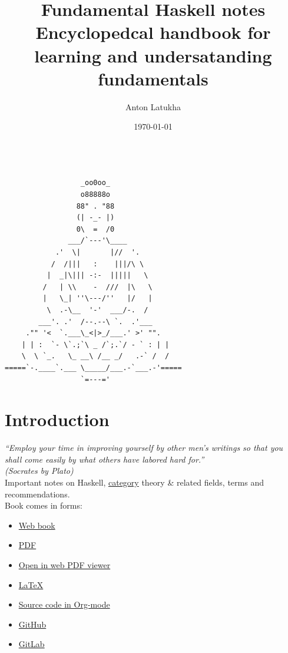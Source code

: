 \documentclass[a4paper,14pt,oneside]{book}
\author{Anton Latukha}
\date{\today}
\title{Fundamental Haskell notes\\\medskip
\large Encyclopedcal handbook for learning and undersatanding fundamentals}
\begin{document}
\maketitle
\setcounter{tocdepth}{10}
\tableofcontents

\begin{verbatim}

                  _oo0oo_
                  o88888o
                 88" . "88
                 (| -_- |)
                 0\  =  /0
               ___/`---'\____
            .'  \|       |//  '.
           /  /|||   :    |||/\ \
          |  _|\||| -:-  |||||   \
         /   | \\    -  ///  |\   \
         |   \_| ''\---/''   |/   |
          \  .-\__  '-'  ___/-.  /
        ___'. .'  /--.--\ `.  .'___
     ."" '<  `.___\_<|>_/___.' >' "".
    | | :  `- \`.;`\ _ /`;.`/ - ` : | |
    \  \ `_.   \_ __\ /__ _/   .-` /  /
=====`-.____`.___ \_____/___.-`___.-'=====
                  `=---='

\end{verbatim}



\part{Introduction}
\label{sec:orgbf06dc8}

\emph{“Employ your time in improving yourself by other men's writings so that you shall come easily by what others have labored hard for.”\\
(Socrates by Plato)}\\

Important notes on Haskell, \hyperref[orgf59ae04]{category} theory \& related fields, terms and recommendations.\\

Book comes in forms:\\
\begin{itemize}
\item \href{https://blog.latukha.com/haskell-notes}{Web book}\\
\item \href{https://github.com/Anton-Latukha/haskell-notes/raw/master/README.pdf}{PDF}\\
\item \href{https://github.com/Anton-Latukha/haskell-notes/blob/master/README.pdf}{Open in web PDF viewer}\\
\item \href{https://github.com/Anton-Latukha/haskell-notes/raw/master/README.tex}{\LaTeX{}}\\
\item \href{https://github.com/Anton-Latukha/haskell-notes/raw/master/README.org}{Source code in Org-mode}\\
\item \href{https://github.com/Anton-Latukha/haskell-notes}{GitHub}\\
\item \href{https://gitlab.com/Anton.Latukha/haskell-notes}{GitLab}\\
\end{itemize}
\end{document}
